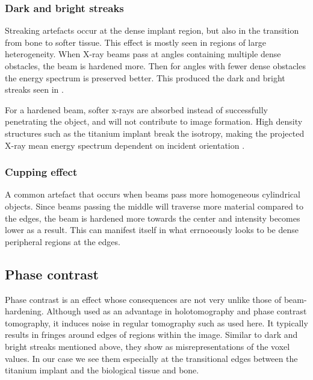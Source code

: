 \subsubsection{Dark and bright streaks}

Streaking artefacts occur at the dense implant region, but also in the transition from bone to softer
tissue. This effect is mostly seen in regions of large heterogeneity. When X-ray beams pass at angles
containing multiple dense obstacles, the beam is hardened more. Then for angles with fewer dense
obstacles the energy spectrum is preserved better. This produced the dark and bright streaks seen in
.

For a hardened beam, softer x-rays are absorbed instead of successfully penetrating the object,
and will not contribute to image formation. High density structures such as the titanium implant
break the isotropy, making the projected X-ray mean energy spectrum dependent on incident orientation
\citep{srnoise}.

\subsubsection{Cupping effect}

A common artefact that occurs when beams pass more homogeneous cylindrical objects. Since beams
passing the middle will traverse more material compared to the edges, the beam is hardened more
towards the center and intensity becomes lower as a result. This can manifest itself in what
errnoeously looks to be dense peripheral regions at the edges.

\subsection{Phase contrast}

Phase contrast is an effect whose consequences are not very unlike those of beam-hardening.
Although used as an advantage in holotomography\citep{holotomography} and phase contrast tomography\citep{phasecontrast},
it induces noise in regular tomography such as used here. It typically results in fringes around edges
of regions within the image\citep{srnoise}. Similar to dark and bright streaks mentioned above,
they show as misrepresentations of the voxel values. In our case we see them especially at the
transitional edges between the titanium implant and the biological tissue and bone.


